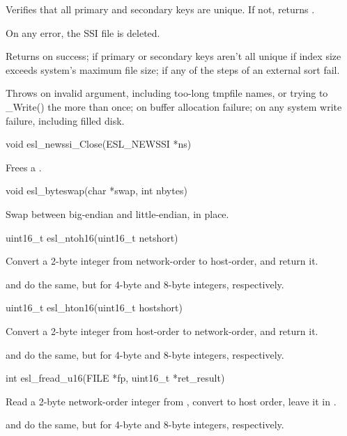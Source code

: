 \begin{sreapi}
Verifies that all primary and secondary keys are unique.
If not, returns .

On any error, the SSI file  is deleted.

Returns        on success;
     if primary or secondary keys aren't all unique
   if index size exceeds system's maximum file size;
     if any of the steps of an external sort fail.

Throws  on invalid argument, including too-long tmpfile names,
or trying to _Write() the  more than once;
   on buffer allocation failure;
 on any system write failure, including filled disk.  



\hypertarget{func:esl_newssi_Close()}
{\item[void esl\_newssi\_Close(ESL\_NEWSSI *ns)]}

Frees a .


\hypertarget{func:esl_byteswap()}
{\item[void esl\_byteswap(char *swap, int nbytes)]}

Swap between big-endian and little-endian, in place.


\hypertarget{func:esl_ntoh16()}
{\item[uint16\_t esl\_ntoh16(uint16\_t netshort)]}

Convert a 2-byte integer from network-order to host-order,
and return it.

 and  do the same, but for 4-byte
and 8-byte integers, respectively.


\hypertarget{func:esl_hton16()}
{\item[uint16\_t esl\_hton16(uint16\_t hostshort)]}

Convert a 2-byte integer from host-order to network-order, and
return it.

 and  do the same, but for 4-byte
and 8-byte integers, respectively.


\hypertarget{func:esl_fread_u16()}
{\item[int esl\_fread\_u16(FILE *fp, uint16\_t *ret\_result)]}

Read a 2-byte network-order integer from , convert to
host order, leave it in .

 and  do the same, but
for 4-byte and 8-byte integers, respectively.


\end{sreapi}
